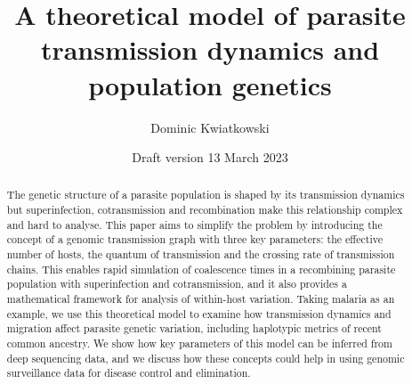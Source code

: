 \documentclass[hidelinks,10pt]{article}
\title{A theoretical model of parasite transmission dynamics and population genetics}
\date{Draft version 13 March 2023}
\author{Dominic Kwiatkowski}
\begin{document}
\maketitle

\begin{abstract}

The genetic structure of a parasite population is shaped by its transmission dynamics but superinfection, cotransmission and recombination make this relationship complex and hard to analyse.  This paper aims to simplify the problem by introducing the concept of a genomic transmission graph with three key parameters: the effective number of hosts, the quantum of transmission and the crossing rate of transmission chains.  This enables rapid simulation of coalescence times in a recombining parasite population with superinfection and cotransmission, and it also provides a mathematical framework for analysis of within-host variation. Taking malaria as an example, we use this theoretical model to examine how transmission dynamics and migration affect parasite genetic variation, including haplotypic metrics of recent common ancestry.  We show how key parameters of this model can be inferred from deep sequencing data, and we discuss how these concepts could help in using genomic surveillance data for disease control and elimination. 


\end{abstract}

\end{document}
